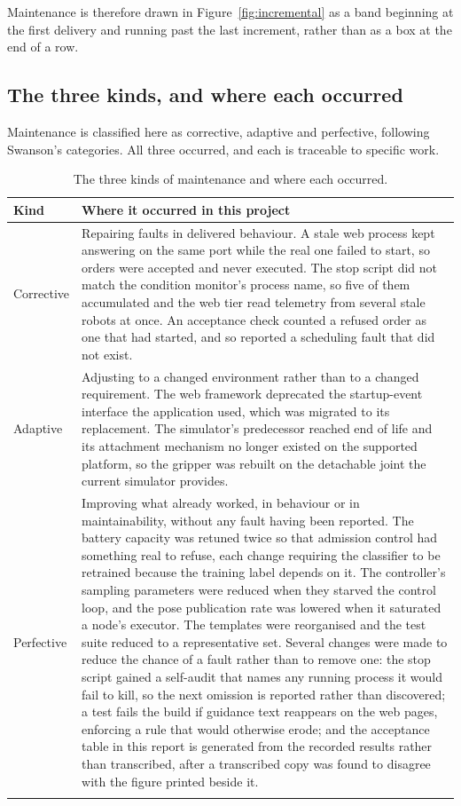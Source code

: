 \documentclass[12pt,a4paper]{report}
\begin{document}
Maintenance is therefore drawn in Figure~\ref{fig:incremental} as a band beginning at the first
delivery and running past the last increment, rather than as a box at the end of a row.

\subsection*{The three kinds, and where each occurred}
Maintenance is classified here as corrective, adaptive and perfective, following Swanson's
categories. All three occurred, and each is traceable to specific work.

\begin{longtable}{@{}p{}p{}@{}}
\toprule
\textbf{Kind} & \textbf{Where it occurred in this project} \\
\midrule
\endhead
Corrective &
Repairing faults in delivered behaviour. A stale web process kept answering on the same port while
the real one failed to start, so orders were accepted and never executed. The stop script did not
match the condition monitor's process name, so five of them accumulated and the web tier read
telemetry from several stale robots at once. An acceptance check counted a refused order as one
that had started, and so reported a scheduling fault that did not exist. \\
Adaptive &
Adjusting to a changed environment rather than to a changed requirement. The web framework
deprecated the startup-event interface the application used, which was migrated to its replacement.
The simulator's predecessor reached end of life and its attachment mechanism no longer existed on
the supported platform, so the gripper was rebuilt on the detachable joint the current simulator
provides. \\
Perfective &
Improving what already worked, in behaviour or in maintainability, without any fault having been
reported. The battery capacity was retuned twice so that admission control had something real to
refuse, each change requiring the classifier to be retrained because the training label depends on
it. The controller's sampling parameters were reduced when they starved the control loop, and the
pose publication rate was lowered when it saturated a node's executor. The templates were
reorganised and the test suite reduced to a representative set. Several changes were made to reduce
the chance of a fault rather than to remove one: the stop script gained a self-audit that names any
running process it would fail to kill, so the next omission is reported rather than discovered; a
test fails the build if guidance text reappears on the web pages, enforcing a rule that would
otherwise erode; and the acceptance table in this report is generated from the recorded results
rather than transcribed, after a transcribed copy was found to disagree with the figure printed
beside it. \\
\bottomrule
\caption{The three kinds of maintenance and where each occurred.}
\label{tab:maintenance}
\end{longtable}
\end{document}
